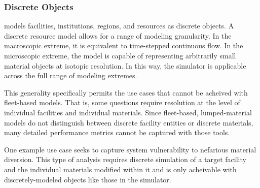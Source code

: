 \subsubsection{Discrete Objects}

\Cyclus models facilities, institutions, regions, and resources as discrete 
objects. A discrete resource model allows for a range of modeling granularity. In the
macroscopic extreme, it is equivalent to time-stepped continuous flow. In the
microscopic extreme, the model is capable of representing arbitrarily small 
material objects at isotopic resolution. In this way, the \Cyclus simulator is 
applicable across the full range of modeling extremes. 

This generality specifically permits the use cases that cannot be acheived with 
fleet-based models. That is, some questions require resolution at the level of 
individual facilities and individual materials.  Since fleet-based, 
lumped-material models do not distinguish between discrete facility entities or 
discrete materials, many detailed performance metrics cannot be captured with 
those tools. 

One example use case seeks to capture system vulnerability to nefarious 
material diversion. This type of analysis requires discrete simulation of a 
target facility and the individual materials modified within it and is only 
acheivable with discretely-modeled objects like those in the \Cyclus simulator. 

